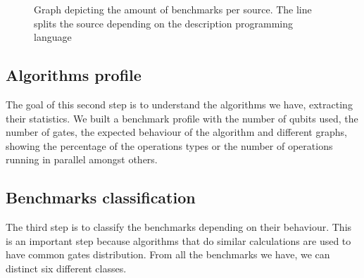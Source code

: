 \begin{figure}
\centering
{}
\label{fig:benchmarks_graph}
\caption{Graph depicting the amount of benchmarks per source. The line splits the source depending on the description programming language}
\end{figure}

\subsection*{Algorithms profile}
\label{sec:org39ff1c6}

The goal of this second step is to understand the algorithms we have, extracting their statistics.
We built a benchmark profile with the number of qubits used, the number of gates, the expected behaviour of the algorithm and different graphs, showing the percentage of the operations types or the number of operations running in parallel amongst others.

\subsection*{Benchmarks classification}
\label{sec:org82da51d}

The third step is to classify the benchmarks depending on their behaviour.
This is an important step because algorithms that do similar calculations are used to have common gates distribution.
From all the benchmarks we have, we can distinct six different classes.

